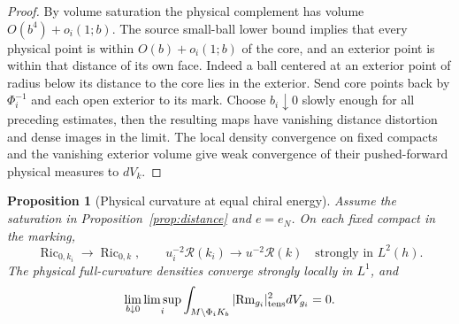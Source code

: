 \documentclass[11pt]{article}
\newtheorem{proposition}[theorem]{Proposition}
\theoremstyle{definition}
\theoremstyle{remark}
\begin{document}
\begin{proof}
By volume saturation the physical complement has volume \(O(b^4)+o_i(1;b)\). The source small-ball lower bound implies that every physical point is within \(O(b)+o_i(1;b)\) of the core, and an exterior point is within that distance of its own face. Indeed a ball centered at an exterior point of radius below its distance to the core lies in the exterior. Send core points back by \(\Phi_i^{-1}\) and each open exterior to its mark. Choose \(b_i\downarrow0\) slowly enough for all preceding estimates, then the resulting maps have vanishing distance distortion and dense images in the limit. The local density convergence on fixed compacts and the vanishing exterior volume give weak convergence of their pushed-forward physical measures to \(dV_k\).
\end{proof}

\begin{proposition}[Physical curvature at equal chiral energy]\label{prop:physical-curvature}
Assume the saturation in Proposition~\ref{prop:distance} and \(e=e_N\). On each fixed compact in the marking,
\[
 \operatorname{Ric}_{0,k_i}\to\operatorname{Ric}_{0,k},\qquad
 u_i^{-2}\mathcal R(k_i)\to u^{-2}\mathcal R(k)
       \quad\text{strongly in }L^2(h).
\]
The physical full-curvature densities converge strongly locally in \(L^1\), and
\[
 \lim_{b\downarrow0}\limsup_i \int_{M\setminus\Phi_i K_b}
             |\mathrm{Rm}_{g_i}|_{\rm tens}^2dV_{g_i}=0 .
\]
\end{proposition}
\end{document}

